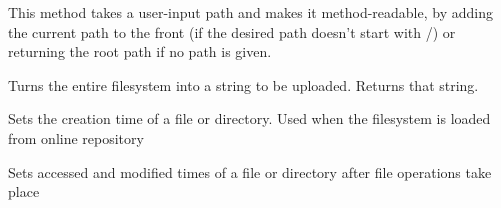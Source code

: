 \documentclass[letterpaper,12pt,openany,oneside]{sphinxmanual}
\begin{document}
\begin{fulllineitems}
\begin{fulllineitems}
\end{fulllineitems}


\begin{fulllineitems}
\label{File_System:covertFS.File_System.covertfs.CovertFS.sanitize_path}
This method takes a user-input path and makes it
method-readable, by adding the current path to the
front (if the desired path doesn't start with /) or
returning the root path if no path is given.

\end{fulllineitems}


\begin{fulllineitems}
\label{File_System:covertFS.File_System.covertfs.CovertFS.save}
Turns the entire filesystem into a string to be uploaded.
Returns that string.

\end{fulllineitems}


\begin{fulllineitems}
\label{File_System:covertFS.File_System.covertfs.CovertFS.setcreate}
Sets the creation time of a file or directory. Used when the filesystem is loaded from online repository

\end{fulllineitems}


\begin{fulllineitems}
\label{File_System:covertFS.File_System.covertfs.CovertFS.settimes}
Sets accessed and modified times of a file or directory after file operations take place

\end{fulllineitems}


\end{fulllineitems}

\end{document}
